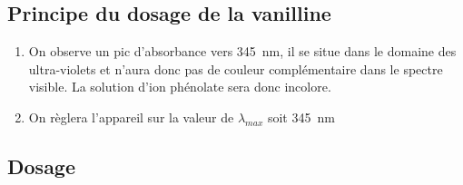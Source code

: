 \documentclass[a4paper,11pt,fleqn]{article}%
\begin{document}
	\subsection{Principe du dosage de la vanilline}
	\begin{enumerate}[resume]
		\item On observe un pic d'absorbance vers \SI{345}{nm}, il se situe dans le domaine des ultra-violets et n'aura donc pas de couleur complémentaire dans le spectre visible. La solution d'ion phénolate sera donc incolore.
		\item On règlera l'appareil sur la valeur de $\lambda_{max}$ soit  \SI{345}{nm}
	\end{enumerate}
	
	\subsection{Dosage}
\end{document}
